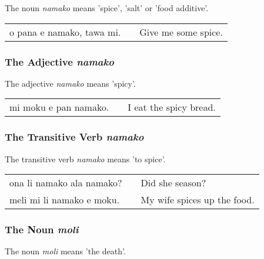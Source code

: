 The noun \textit{namako} means 'spice', 'salt' or 'food additive'.

\begin{supertabular}{p{5,5cm}|ll}
    o pana e namako, tawa mi. &  & Give me some spice. \\
\end{supertabular}

%
%
\subsubsection*{The Adjective \textit{namako}}
%

The adjective \textit{namako} means 'spicy'.

\begin{supertabular}{p{5,5cm}|ll}
    mi moku e pan namako. &  & I eat the spicy bread. \\
\end{supertabular}

%
%
\subsubsection*{The Transitive Verb \textit{namako}}
%

The transitive verb \textit{namako} means 'to spice'.

\begin{supertabular}{p{5,5cm}|ll}
    ona li namako ala namako? &  & Did she season?             \\
    meli mi li namako e moku. &  & My wife spices up the food. \\
\end{supertabular}

%
%
\subsubsection*{The Noun \textit{moli}}
%
%

The noun \textit{moli} means 'the death'.

